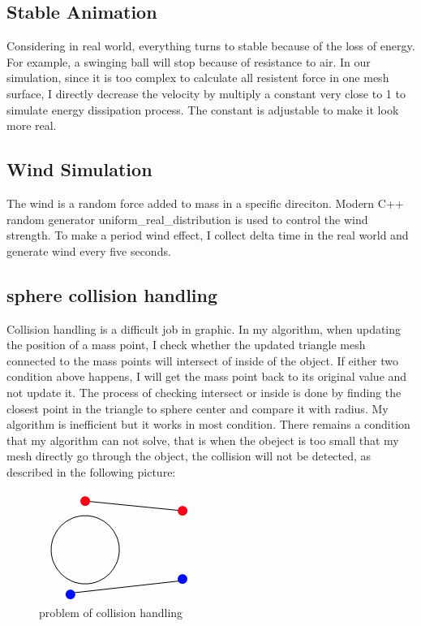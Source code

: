 \documentclass[acmtog]{acmart}
\begin{document}
\subsection{Stable Animation}
Considering in real world, everything turns to stable because of the loss of energy. For example, a swinging ball will stop because of resistance to air. In our simulation, since it is too complex to calculate all resistent force in one mesh surface, I directly decrease the velocity by multiply a constant very close to 1 to simulate energy dissipation process. The constant is adjustable to make it look more real.
\subsection{Wind Simulation}
The wind is a random force added to mass in a specific direciton. Modern C++ random generator uniform\_real\_distribution is used to control the wind strength. To make a period wind effect, I collect delta time in the real world and generate wind every five seconds.
\subsection{sphere collision handling}
Collision handling is a difficult job in graphic. In my algorithm, when updating the position of a mass point, I check whether the updated triangle mesh connected to the mass points will intersect of inside of the object. If either two condition above happens, I will get the mass point back to its original value and not update it. The process of checking intersect or inside is done by finding the closest point in the triangle to sphere center and compare it with radius. My algorithm is inefficient but it works in most condition. There remains a condition that my algorithm can not solve, that is when the obeject is too small that my mesh directly go through the object, the collision will not be detected, as described in the following picture:\\
\begin{figure}[h]
	\centering
	\includegraphics[width=0.7\linewidth]{problem.png}
	\caption{problem of collision handling}
	\label{fig:problem of collision handling}
\end{figure}
\end{document}
